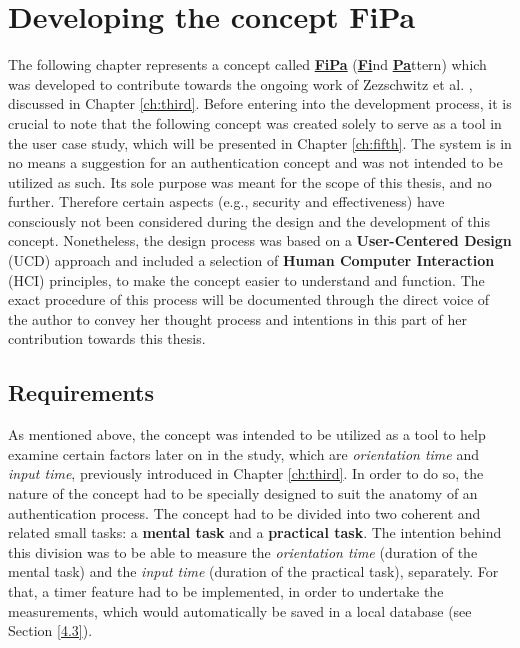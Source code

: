 
\chapter{Developing the concept FiPa}\label{ch:forth}
The following chapter represents a concept called \underline{\textbf{FiPa}} (\underline{\textbf{Fi}}nd \underline{\textbf{Pa}}ttern) which was developed to contribute towards the ongoing work of Zezschwitz et al. \cite{Zezschwitz}, discussed in Chapter \ref{ch:third}. Before entering into the development process, it is crucial to note that the following concept was created solely to serve as a tool in the user case study, which will be presented in Chapter \ref{ch:fifth}. The system is in no means a suggestion for an authentication concept and was not intended to be utilized as such. Its sole purpose was meant for the scope of this thesis, and no further. Therefore certain aspects (e.g., security and effectiveness) have consciously not been considered during the design and the development of this concept. Nonetheless, the design process was based on a  \textbf{User-Centered Design} (UCD) approach and included a selection of \textbf{Human Computer Interaction} (HCI) principles, to make the concept easier to understand and function. The exact procedure of this process will be documented through the direct voice of the author to convey her thought process and intentions in this part of her contribution towards this thesis. 

\section{Requirements} \label{4.1}
As mentioned above, the concept was intended to be utilized as a tool to help examine certain factors later on in the study, which are \textit{orientation time} and \textit{input time}, previously introduced in Chapter \ref{ch:third}. In order to do so, the nature of the concept had to be specially designed to suit the anatomy of an authentication process. The concept had to be divided into two coherent and related small tasks: a \textbf{mental task} and a \textbf{practical task}. The intention behind this division was to be able to measure the \textit{orientation time} (duration of the mental task) and the \textit{input time} (duration of the practical task), separately. For that, a timer feature had to be implemented, in order to undertake the measurements, which would automatically be saved in a local database (see Section \ref{4.3}).\\

